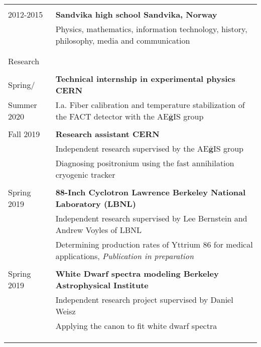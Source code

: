 \documentclass[letterpaper,9pt,oneside]{article}
\begin{document}
\begin{tabular}{@{} l l}
	& \\
	2012-2015 & \textbf{Sandvika high school \hspace{2mm}\textbar\hspace{2mm}  Sandvika, Norway}  \\
	& Physics, mathematics, information technology, history, philosophy, media and communication\\ 	     & \\
	&\vspace{5mm} \\ 
	\Large{Research}    \vspace{2mm}  &\\ \hline \vspace{2mm} &\\
	Spring/ & \textbf{Technical internship in experimental physics \hspace{2mm}\textbar\hspace{2mm} CERN} \\
	Summer 2020& I.a. Fiber calibration and temperature stabilization of the FACT detector with the AE$\bar{\mathbf{g}}$IS group\\
	& \\
	Fall 2019 & \textbf{Research assistant \hspace{2mm}\textbar\hspace{2mm} CERN} \\
	& Independent research supervised by the AE$\bar{\mathbf{g}}$IS group\\
	&Diagnosing positronium using the fast annihilation cryogenic tracker\\
	& \\
	Spring 2019 \hspace{10mm} & \textbf{88-Inch Cyclotron \hspace{2mm}\textbar\hspace{2mm} Lawrence Berkeley National Laboratory (LBNL)} \\
	& Independent research supervised by Lee Bernstein and Andrew Voyles of LBNL\\
	& Determining production rates of Yttrium 86 for medical applications, \textit{Publication in preparation}\\
	& \\
	Spring 2019 & \textbf{White Dwarf spectra modeling \hspace{2mm}\textbar\hspace{2mm} Berkeley Astrophysical Institute} \\
	& Independent research project supervised by Daniel Weisz\\
	& Applying the canon to fit white dwarf spectra\\
	& \\
	& \\  \vspace{0.1mm}   &\\
\end{tabular}\newpage 
\end{document}
